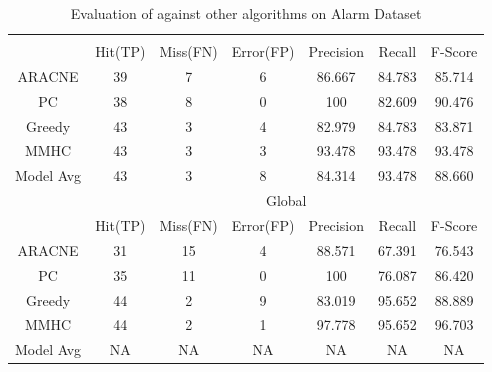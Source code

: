 \begin{table}[th]
\begin{center}
\caption{\label{tab:alarmComp} Evaluation of \lama{}
against other algorithms on Alarm Dataset}
\small
\begin{tabular}{|c|c|c|c|c|c|c|}
\hline
 &\multicolumn{6}{c|}{\lama{}}\\
\cline{2-7}
 & Hit(TP) & Miss(FN) & Error(FP) & Precision & Recall & F-Score \\
\hline
ARACNE & 39 & 7 & 6 & 86.667 & 84.783 & 85.714 \\
PC     & 38 & 8 & 0 & 100    & 82.609 & 90.476 \\
Greedy & 43 & 3 & 4 & 82.979 & 84.783 & 83.871 \\
MMHC   & 43 & 3 & 3 & 93.478 & 93.478 & 93.478 \\
\hline
Model Avg & 43 & 3 & 8 & 84.314 & 93.478 & 88.660 \\
\hline \hline
 &\multicolumn{6}{c|}{Global}\\
\cline{2-7}
 & Hit(TP) & Miss(FN) & Error(FP) & Precision & Recall & F-Score \\
\hline
ARACNE & 31 & 15 & 4 & 88.571 & 67.391 & 76.543 \\
PC & 35 & 11 & 0 & 100    & 76.087 & 86.420 \\
Greedy & 44 & 2  & 9 & 83.019 & 95.652 & 88.889 \\
MMHC & 44 & 2  & 1 & 97.778 & 95.652 & 96.703 \\
\hline
Model Avg & NA & NA & NA & NA & NA & NA \\
\hline
\end{tabular}
\end{center}
\end{table}

